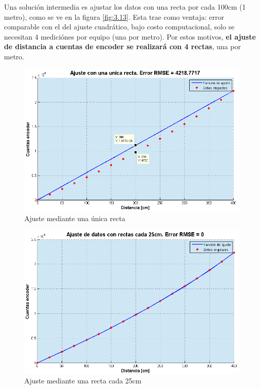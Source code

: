 Una solución intermedia es ajustar los datos con una recta por cada 100cm (1 metro), como se ve en la figura \ref{fig:3.13}. Esta trae como ventaja: error comparable con el del ajuste cuadrático, bajo costo computacional, solo se necesitan 4 mediciónes por equipo (una por metro). Por estos motivos, \textbf{el ajuste de distancia a cuentas de encoder se realizará con 4 rectas}, una por metro.


\begin{figure}[!ht]
	\centering
	\includegraphics[width=15cm,scale=1]{resources/3_11-ajusteRectasUnica.png}
	\caption{Ajuste mediante una única recta}
	\label{fig:\thefigure}
\end{figure}

\begin{figure}[!ht]
	\centering
	\includegraphics[width=15cm,scale=1]{resources/3_12-ajusteRectas25cm.png}
	\caption{Ajuste mediante una recta cada 25cm}
	\label{fig:\thefigure}
\end{figure}

